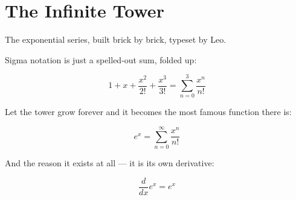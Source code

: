 
\section{The Infinite Tower}

The exponential series, built brick by brick, typeset by Leo.

Sigma notation is just a spelled-out sum, folded up:

$$ 1 + x + \frac{x^2}{2!} + \frac{x^3}{3!} = \sum_{n=0}^{3} \frac{x^n}{n!} $$

Let the tower grow forever and it becomes the most famous function there is:

$$ e^x = \sum_{n=0}^{\infty} \frac{x^n}{n!} $$

And the reason it exists at all — it is its own derivative:

$$ \frac{d}{dx} e^x = e^x $$

